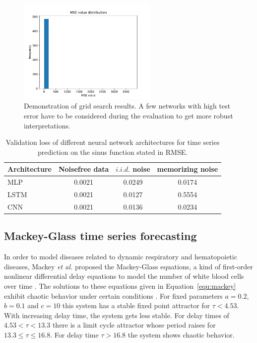 \documentclass{article}
\begin{document}
\begin{figure}
    \centering
    \includegraphics[width=0.6\textwidth]{figures/histogram.pdf}
    \caption{Demonstration of grid search results. A few networks with high
    test error have to be considered during the evaluation to get more 
    robust interpretations.}
    \label{fig:histogram}
\end{figure}

\begin{table}
    \centering
    \begin{tabular}{l|c|c|c}
        Architecture & Noisefree data & $i.i.d.$ noise & memorizing noise \\
        \hline
        MLP          & 0.0021         & 0.0249         & 0.0174           \\
        LSTM         & 0.0021         & 0.0127         & 0.5554           \\
        CNN          & 0.0021         & 0.0136         & 0.0234           \\
    \end{tabular}
    \caption{Validation loss of different neural network architectures for
        time series prediction on the sinus function stated
        in RMSE.}
    \label{tab:noise_finals}
\end{table}

\subsection{Mackey-Glass time series forecasting}

In order to model diseases related to dynamic respiratory and hematopoietic
diseases, Mackey \textit{et al.} proposed the Mackey-Glass equations, a kind of
first-order nonlinear differential delay equations to model
the number of white blood cells over time \cite{mackey1977}. The solutions to
these equations given in Equation~\ref{equ:mackey}
exhibit chaotic behavior under certain conditions \cite{farmer1982}. For fixed
parameters $a = 0.2$, $b=0.1$ and $c=10$ this system has a stable fixed point
attractor for $\tau < 4.53$. With increasing delay time, the system gets less
stable. For delay times of $4.53 < \tau < 13.3$ there is a limit cycle attractor
whose period raises for $13.3 \leq \tau \leq 16.8$. For delay time
$\tau > 16.8$ the system shows chaotic behavior.
\end{document}

